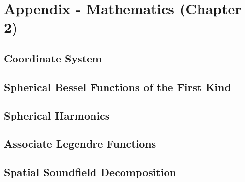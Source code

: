 \chapter{Appendix - Mathematics (Chapter 2)}

\section{Coordinate System}

\section{Spherical Bessel Functions of the First Kind}
\section{Spherical Harmonics}
\section{Associate Legendre Functions}

\section{Spatial Soundfield Decomposition}










